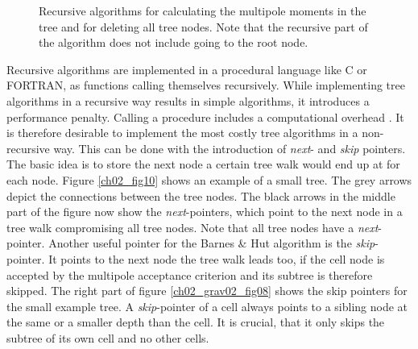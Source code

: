 \begin{figure}[htbp]
\begin{center}
\caption{Recursive algorithms for calculating the multipole moments in the tree and for deleting all tree nodes. Note that the recursive part of the algorithm does not include going to the root node.}
\label{ch02_fig14}
\end{center}
\end{figure}

Recursive algorithms are implemented in a procedural language like C or FORTRAN, as functions calling themselves recursively. While implementing tree algorithms in a recursive way results in simple algorithms, it introduces a performance penalty. Calling a procedure includes a computational overhead \citep{bryant2010computer}. It is therefore desirable to implement the most costly tree algorithms in a non-recursive way. This can be done with the introduction of \emph{next}- and \emph{skip} pointers. The basic idea is to store the next node a certain tree walk would end up at for each node. Figure \ref{ch02_fig10} shows an example of a small tree. The grey arrows depict the connections between the tree nodes. The black arrows in the middle part of the figure now show the \emph{next}-pointers, which point to the next node in a tree walk compromising all tree nodes. Note that all tree nodes have a \emph{next}-pointer. Another useful pointer for the Barnes \& Hut algorithm is the \emph{skip}-pointer. It points to the next node the tree walk leads too, if the cell node is accepted by the multipole acceptance criterion and its subtree is therefore skipped. The right part of figure \ref{ch02_grav02_fig08} shows the skip pointers for the small example tree. A \emph{skip}-pointer of a cell always points to a sibling node at the same or a smaller depth than the cell. It is crucial, that it only skips the subtree of its own cell and no other cells. 

